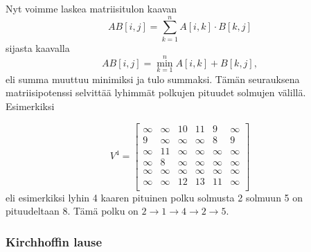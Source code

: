 Nyt voimme laskea matriisitulon kaavan
\[
AB[i,j] = \sum_{k=1}^n A[i,k] \cdot B[k,j]
\]
sijasta kaavalla
\[
AB[i,j] = \min_{k=1}^n A[i,k] + B[k,j],
\]
eli summa muuttuu minimiksi ja tulo summaksi.
Tämän seurauksena matriisipotenssi
selvittää lyhimmät polkujen pituudet solmujen
välillä. Esimerkiksi

\[
V^4= \begin{bmatrix}
  \infty & \infty & 10 & 11 & 9 & \infty \\
  9 & \infty & \infty & \infty & 8 & 9 \\
  \infty & 11 & \infty & \infty & \infty & \infty \\
  \infty & 8 & \infty & \infty & \infty & \infty \\
  \infty & \infty & \infty & \infty & \infty & \infty \\
  \infty & \infty & 12 & 13 & 11 & \infty \\
 \end{bmatrix}
\]
eli esimerkiksi lyhin 4 kaaren pituinen polku
solmusta 2 solmuun 5 on pituudeltaan 8.
Tämä polku on $2 \rightarrow 1 \rightarrow 4 \rightarrow 2 \rightarrow 5$.

\subsubsection{Kirchhoffin lause}


